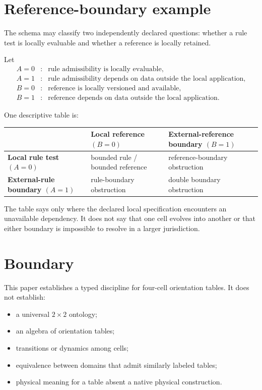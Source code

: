 \documentclass[11pt]{article}
\begin{document}
\section{Reference-boundary example}

The schema may classify two independently declared questions: whether a rule test is locally evaluable and whether a reference is locally retained.

Let
\[
\begin{array}{lll}
A=0&:&\text{rule admissibility is locally evaluable},\\
A=1&:&\text{rule admissibility depends on data outside the local application},\\
B=0&:&\text{reference is locally versioned and available},\\
B=1&:&\text{reference depends on data outside the local application}.
\end{array}
\]

One descriptive table is:

\begin{center}
\begin{tabular}{@{}p{1.7in}p{2.0in}p{2.0in}@{}}
\toprule
& \textbf{Local reference $(B=0)$} & \textbf{External-reference boundary $(B=1)$}\\
\midrule
\textbf{Local rule test $(A=0)$} & bounded rule / bounded reference & reference-boundary obstruction\\
\textbf{External-rule boundary $(A=1)$} & rule-boundary obstruction & double boundary obstruction\\
\bottomrule
\end{tabular}
\end{center}

The table says only where the declared local specification encounters an unavailable dependency. It does not say that one cell evolves into another or that either boundary is impossible to resolve in a larger jurisdiction.

\section{Boundary}

This paper establishes a typed discipline for four-cell orientation tables. It does not establish:
\begin{itemize}
\item a universal $2\times2$ ontology;
\item an algebra of orientation tables;
\item transitions or dynamics among cells;
\item equivalence between domains that admit similarly labeled tables;
\item physical meaning for a table absent a native physical construction.
\end{itemize}
\end{document}
